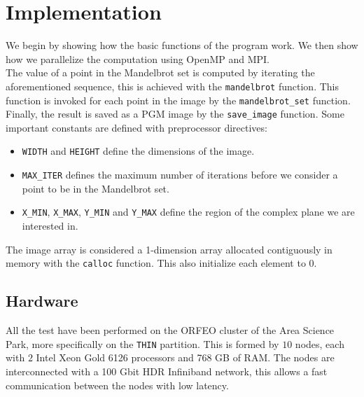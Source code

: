 \section{Implementation}
    We begin by showing how the basic functions of the program work. We then
    show how we parallelize the computation using OpenMP and MPI. \\
    The value of a point in the Mandelbrot set is computed by iterating the
    aforementioned sequence, this is achieved with the \texttt{mandelbrot}
    function. This function is invoked for each point in the image by the
    \texttt{mandelbrot\_set} function. Finally, the result is saved as a PGM
    image by the \texttt{save\_image} function. Some important constants are
    defined with preprocessor directives:
    \begin{itemize}
        \item \texttt{WIDTH} and \texttt{HEIGHT} define the dimensions of the
            image.
        \item \texttt{MAX\_ITER} defines the maximum number of iterations
            before we consider a point to be in the Mandelbrot set.
        \item \texttt{X\_MIN}, \texttt{X\_MAX}, \texttt{Y\_MIN} and \texttt{Y\_MAX}
            define the region of the complex plane we are interested in.
    \end{itemize}
    The image array is considered a 1-dimension array allocated contiguously
    in memory with the \texttt{calloc} function. This also initialize each
    element to 0.

\subsection{Hardware}
    All the test have been performed on the ORFEO cluster of the Area Science
    Park, more specifically on the \texttt{THIN} partition. This is formed
    by $10$ nodes, each with $2$ Intel Xeon Gold 6126 processors and 768 GB of
    RAM. The nodes are interconnected with a 100 Gbit HDR Infiniband network,
    this allows a fast communication between the nodes with low latency.

